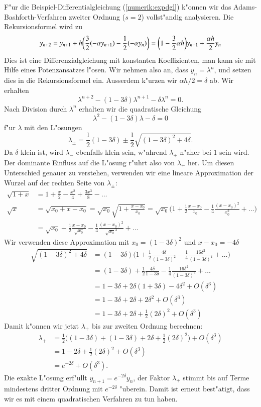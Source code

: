 F"ur die Beispiel-Differentialgleichung (\ref{numerik:expdgl}) k"onnen
wir das Adams-Bashforth-Verfahren zweiter Ordnung ($s=2$) vollst"andig
analysieren.
Die Rekursionsformel wird zu
\[
y_{n+2}=y_{n+1}+h\biggl(\frac32 (-\alpha y_{n+1})-\frac12(-\alpha y_n)\biggr)
=
\biggl(1-\frac32\alpha h\biggr)
y_{n+1}
+\frac{\alpha h}{2}
y_{n\mathstrut}
\]
Dies ist eine Differenzialgleichung mit konstanten Koeffizienten, man kann
sie mit Hilfe eines Potenzansatzes l"osen. 
Wir nehmen also an, dass $y_n=\lambda^n$, und setzen dies in die
Rekursionsformel ein.
Ausserdem k"urzen wir $\alpha h/2=\delta$  ab.
Wir erhalten
\[
\lambda^{n+2}-(1-3\delta)\lambda^{n+1}-\delta\lambda^n=0.
\]
Nach Division durch $\lambda^n$ erhalten wir die quadratische Gleichung
\[
\lambda^2-(1-3\delta )\lambda-\delta=0
\]
f"ur $\lambda$ mit den L"osungen
\[
\lambda_\pm
=
\frac12(1-3\delta) \pm \frac12\sqrt{(1-3\delta)^2+4\delta}.
\]
Da $\delta$ klein ist, wird $\lambda_-$ ebenfalls klein sein,
w"ahrend $\lambda_+$ n"aher bei $1$ sein wird.
Der dominante Einfluss auf die L"osung r"uhrt also von $\lambda_+$ her.
Um diesen Unterschied genauer zu verstehen, verwenden wir eine
lineare Approximation der Wurzel auf der rechten Seite von $\lambda_\pm$:
\begin{align*}
\sqrt{1+x}
&=
1+\frac{x}{2}-\frac{x^2}{4}+\frac{3x^3}{8}-\dots
\\
\sqrt{x}
&=
\sqrt{x_0+x-x_0}
=
\sqrt{x_0}\sqrt{1+\frac{x-x_0}{x_0}}
=
\sqrt{x_0}\biggl(1+\frac12\frac{x-x_0}{x_0}-\frac14\frac{(x-x_0)^2}{x_0^2}+\dots\biggr)
\\
&=
\sqrt{x_0}+\frac12\frac{x-x_0}{\sqrt{x_0}}-\frac14\frac{(x-x_0)^2}{\sqrt{x_0}^3}+\dots
\end{align*}
Wir verwenden diese Approximation mit $x_0=(1-3\delta)^2$ und $x-x_0=-4\delta$
\begin{align*}
\sqrt{(1-3\delta)^2+4\delta}
&=
(1-3\delta)\biggl(1+\frac12\frac{4\delta}{(1-3\delta)^2}
-\frac14\frac{16\delta^2}{(1-3\delta)^4}+\dots\biggr)
\\
&=(1-3\delta)+\frac12\frac{4\delta}{1-3\delta}
-\frac14\frac{16\delta^2}{(1-3\delta)^3}+\dots
\\
&=1-3\delta+2\delta(1+3\delta)-4\delta^2+O(\delta^3)
\\
&=1-3\delta+2\delta + 2\delta^2+O(\delta^3)
\\
&=1-3\delta+2\delta + \frac12(2\delta)^2+O(\delta^3)
\end{align*}
Damit k"onnen wir jetzt $\lambda_+$ bis zur zweiten Ordnung berechnen:
\begin{align*}
\lambda_+
&=
\frac12\biggl((1-3\delta)+ (1-3\delta)+2\delta+\frac12(2\delta)^2\biggr)
+O(\delta^3)
\\
&=
1-2\delta+\frac12(2\delta)^2+O(\delta^3)
\\
&=e^{-2\delta}+O(\delta^3).
\end{align*}
Die exakte L"osung erf"ullt $y_{n+1}=e^{-2\delta}y_n$, der Faktor
$\lambda_+$ stimmt bis auf Terme mindestens dritter Ordnung mit 
$e^{-2\delta}$ "uberein.
Damit ist erneut best"atigt, dass wir es mit einem quadratischen Verfahren zu
tun haben.

